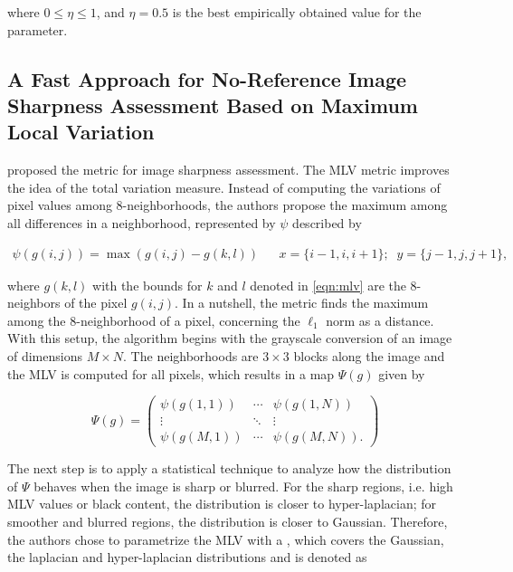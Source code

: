 \noindent where $0 \leq \eta \leq 1$, and $\eta = 0.5$ is the best empirically obtained value for the parameter.

\subsection{A Fast Approach for No-Reference Image Sharpness Assessment Based on Maximum Local Variation}

 proposed the  metric for image sharpness assessment. The MLV metric improves the idea of the total variation measure. Instead of computing the variations of pixel values among 8-neighborhoods, the authors propose the maximum among all differences in a neighborhood, represented by $\psi$ described by

\begin{align}
\label{eqn:mlv}
\psi(g(i,j)) = \max(g(i,j) - g(k,l))
&&
x = \{i - 1, i, i + 1\};\;\;
y = \{j - 1, j, j + 1\},
\end{align}

\noindent where $g(k,l)$ with the bounds for $k$ and $l$ denoted in \autoref{eqn:mlv} are the 8-neighbors of the pixel $g(i,j)$. In a nutshell, the metric finds the maximum among the 8-neighborhood of a pixel, concerning the $\ell_{1}$ norm as a distance. With this setup, the algorithm begins with the grayscale conversion of an image of dimensions $M \times N$. The neighborhoods are $3 \times 3$ blocks along the image and the MLV is computed for all pixels, which results in a map $\Psi(g)$ given by

\begin{equation}
\label{eqn:mlv_matrix}
\Psi(g) =
    \begin{pmatrix}
        \psi(g(1,1)) & \cdots &  \psi(g(1,N))\\
        \vdots & \ddots & \vdots\\
        \psi(g(M,1)) & \cdots & \psi(g(M,N)).
    \end{pmatrix}
\end{equation}

\noindent The next step is to apply a statistical technique to analyze how the distribution of $\Psi$ behaves when the image is sharp or blurred. For the sharp regions, i.e. high MLV values or black content, the distribution is closer to hyper-laplacian; for smoother and blurred regions, the distribution is closer to Gaussian. Therefore, the authors chose to parametrize the MLV with a , which covers the Gaussian, the laplacian and hyper-laplacian distributions and is denoted as

